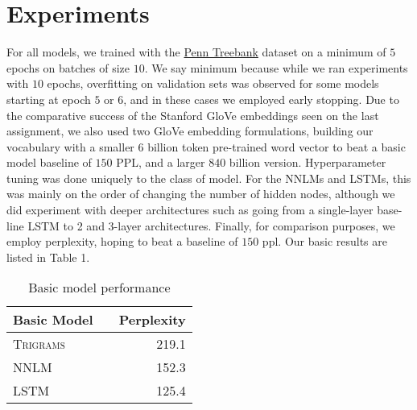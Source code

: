 \documentclass[11pt]{article}
\begin{document}




\section{Experiments}
For all models, we trained with the \href{http://aclweb.org/anthology/J93-2004)}{Penn Treebank} dataset on a minimum of $5$ epochs on batches of size $10$. We say minimum because while we ran experiments with $10$ epochs, overfitting on validation sets was observed for some models starting at epoch $5$ or $6$, and in these cases we employed early stopping. Due to the comparative success of the Stanford GloVe embeddings seen on the last assignment, we also used two GloVe embedding formulations, building our vocabulary with a smaller $6$ billion token pre-trained word vector to beat a basic model baseline of $150$ PPL, and a larger $840$ billion version. Hyperparameter tuning was done uniquely to the class of model. For the NNLMs and LSTMs, this was mainly on the order of changing the number of hidden nodes, although we did experiment with deeper architectures such as going from a single-layer base-line LSTM to 2 and 3-layer architectures. Finally, for comparison purposes, we employ perplexity, hoping to beat a baseline of $150$ ppl. Our basic results are listed in Table 1.

\begin{table}[h]
\centering
\begin{tabular}{llr}
 \toprule
 Basic Model &  & Perplexity \\
 \midrule
 \textsc{Trigrams} & & 219.1\\
 \textsc{NNLM} & & 152.3 \\
 \textsc{LSTM} & & 125.4  \\
 \bottomrule
\end{tabular}
\caption{\label{tab:results} Basic model performance}
\end{table}
\end{document}
